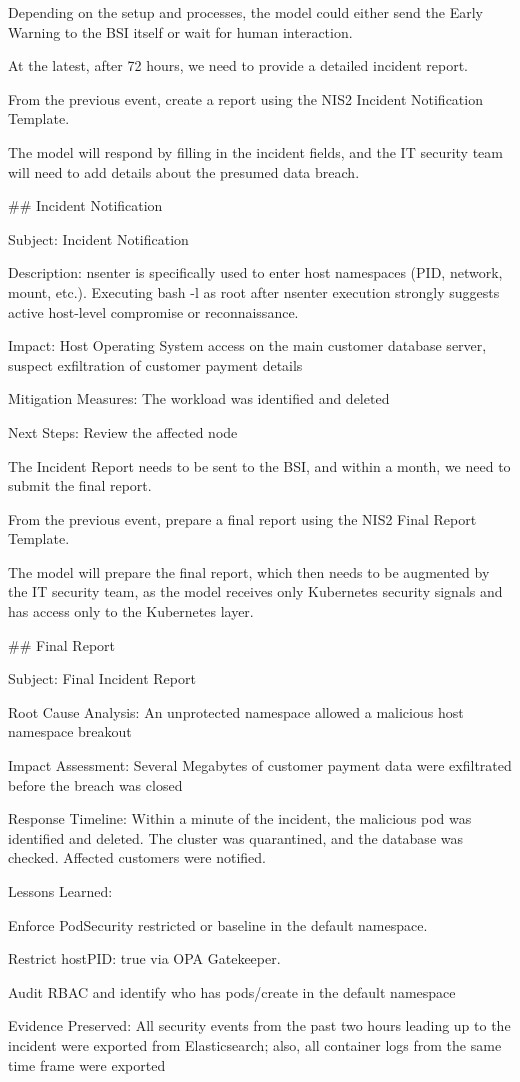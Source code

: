 Depending on the setup and processes, the model could either send the Early Warning to the BSI itself or wait for human interaction.

At the latest, after 72 hours, we need to provide a detailed incident report.

\indent\colorbox{codegrey}{
    \parbox{0.8\linewidth}{
From the previous event, create a report using the NIS2 Incident Notification Template.
     }
}

The model will respond by filling in the incident fields, and the IT security team will need to add details about the presumed data breach.

\indent\colorbox{codegrey}{
    \parbox{0.8\linewidth}{
\#\# Incident Notification

Subject: Incident Notification

Description: nsenter is specifically used to enter host namespaces (PID, network, mount, etc.). Executing bash -l as root after nsenter execution strongly suggests active host-level compromise or reconnaissance.

Impact: Host Operating System access on the main customer database server, suspect exfiltration of customer payment details

Mitigation Measures: The workload was identified and deleted

Next Steps: Review the affected node
    }
}

The Incident Report needs to be sent to the BSI, and within a month, we need to submit the final report.

\indent\colorbox{codegrey}{
    \parbox{0.8\linewidth}{
From the previous event, prepare a final report using the NIS2 Final Report Template.
     }
}

The model will prepare the final report, which then needs to be augmented by the IT security team, as the model receives only Kubernetes security signals and has access only to the Kubernetes layer.

\indent\colorbox{codegrey}{
    \parbox{0.8\linewidth}{
\#\# Final Report

Subject: Final Incident Report

Root Cause Analysis: An unprotected namespace allowed a malicious host namespace breakout

Impact Assessment: Several Megabytes of customer payment data were exfiltrated before the breach was closed

Response Timeline: Within a minute of the incident, the malicious pod was identified and deleted. The cluster was quarantined, and the database was checked. Affected customers were notified.

Lessons Learned: 

Enforce PodSecurity restricted or baseline in the default namespace.

Restrict hostPID: true via OPA Gatekeeper.

Audit RBAC and identify who has pods/create in the default namespace

Evidence Preserved: All security events from the past two hours leading up to the incident were exported from Elasticsearch; also, all container logs from the same time frame were exported
     }
}

